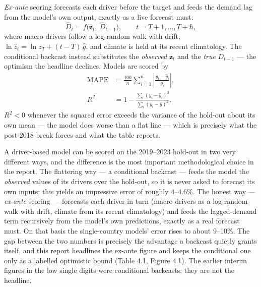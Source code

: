 \documentclass[10pt,twocolumn]{article}
\begin{document}
\noindent \emph{Ex-ante} scoring forecasts each driver before the target and
feeds the demand lag from the model's own output, exactly as a live forecast
must:
\begin{equation}
\hat D_t=f\!\bigl(\hat{\mathbf{z}}_t,\ \hat D_{t-1}\bigr),\qquad t=T{+}1,\dots,T{+}h,
\label{eq:exante}
\end{equation}
where macro drivers follow a log random walk with drift,
$\ln\hat z_{t}=\ln z_{T}+(t-T)\,\hat g$, and climate is held at its recent
climatology. The conditional backcast instead substitutes the \emph{observed}
$\mathbf{z}_t$ and the \emph{true} $D_{t-1}$ --- the optimism the headline
declines. Models are scored by
\begin{equation}
\begin{aligned}
\mathrm{MAPE}&=\frac{100}{n}\sum_{i=1}^{n}\left|\frac{y_i-\hat y_i}{y_i}\right|,\\
R^{2}&=1-\frac{\sum_i (y_i-\hat y_i)^2}{\sum_i (y_i-\bar y)^2}.
\end{aligned}
\label{eq:scores}
\end{equation}
$R^{2}<0$ whenever the squared error exceeds the variance of the hold-out about
its own mean --- the model does worse than a flat line --- which is precisely
what the post-2018 break forces and what the table reports.

A driver-based model can be scored on the 2019--2023 hold-out in two very different ways, and the difference is the most important methodological choice in the report. The flattering way --- a conditional backcast --- feeds the model the \textit{observed} values of its drivers over the hold-out, so it is never asked to forecast its own inputs; this yields an impressive error of roughly 4--4.6\%. The honest way --- \textit{ex-ante} scoring --- forecasts each driver in turn (macro drivers as a log random walk with drift, climate from its recent climatology) and feeds the lagged-demand term recursively from the model's own predictions, exactly as a real forecast must. On that basis the single-country models' error rises to about 9--10\%. The gap between the two numbers is precisely the advantage a backcast quietly grants itself, and this report headlines the ex-ante figure and keeps the conditional one only as a labelled optimistic bound (Table 4.1, Figure 4.1). The earlier interim figures in the low single digits were conditional backcasts; they are not the headline.
\end{document}
